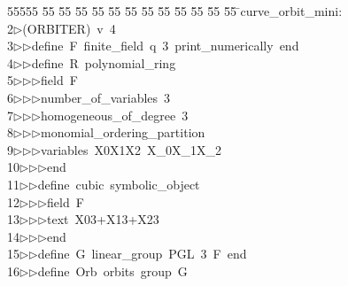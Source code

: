 %
%
\begin{tabbing}
55555 \= 55 \= 55 \= 55 \= 55 \= 55 \= 55 \= 55 \= 55 \= 55 \= 55 \= 55 \= 55 \= \>curve\_orbit\_mini:\\[0pt]
2\>$\triangleright$\>(ORBITER)\ v\ 4\ \\[0pt]
3\>$\triangleright$\>$\triangleright$\>define\ F\ finite\_field\ q\ 3\ print\_numerically\ end\ \\[0pt]
4\>$\triangleright$\>$\triangleright$\>define\ R\ polynomial\_ring\ \\[0pt]
5\>$\triangleright$\>$\triangleright$\>$\triangleright$\>field\ F\ \\[0pt]
6\>$\triangleright$\>$\triangleright$\>$\triangleright$\>number\_of\_variables\ 3\ \\[0pt]
7\>$\triangleright$\>$\triangleright$\>$\triangleright$\>homogeneous\_of\_degree\ 3\ \\[0pt]
8\>$\triangleright$\>$\triangleright$\>$\triangleright$\>monomial\_ordering\_partition\ \\[0pt]
9\>$\triangleright$\>$\triangleright$\>$\triangleright$\>variables\ X0X1X2\ X\_0X\_1X\_2\ \\[0pt]
10\>$\triangleright$\>$\triangleright$\>$\triangleright$\>end\ \\[0pt]
11\>$\triangleright$\>$\triangleright$\>define\ cubic\ symbolic\_object\ \\[0pt]
12\>$\triangleright$\>$\triangleright$\>$\triangleright$\>field\ F\ \\[0pt]
13\>$\triangleright$\>$\triangleright$\>$\triangleright$\>text\ X03+X13+X23\ \\[0pt]
14\>$\triangleright$\>$\triangleright$\>$\triangleright$\>end\ \\[0pt]
15\>$\triangleright$\>$\triangleright$\>define\ G\ linear\_group\ PGL\ 3\ F\ end\ \\[0pt]
16\>$\triangleright$\>$\triangleright$\>define\ Orb\ orbits\ group\ G\ \\[0pt]

\end{tabbing}

